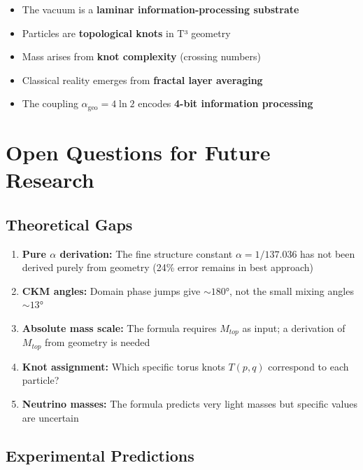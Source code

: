 \documentclass[11pt, a4paper]{article}
\theoremstyle{remark}
\newcommand{\alphageo}{\alpha_{\text{geo}}}
\begin{document}
\begin{itemize}
    \item The vacuum is a \textbf{laminar information-processing substrate}
    \item Particles are \textbf{topological knots} in T³ geometry
    \item Mass arises from \textbf{knot complexity} (crossing numbers)
    \item Classical reality emerges from \textbf{fractal layer averaging}
    \item The coupling $\alphageo = 4\ln 2$ encodes \textbf{4-bit information processing}
\end{itemize}

\section{Open Questions for Future Research}

\subsection{Theoretical Gaps}

\begin{enumerate}
    \item \textbf{Pure $\alpha$ derivation:} The fine structure constant $\alpha = 1/137.036$ has not been derived purely from geometry (24\% error remains in best approach)
    
    \item \textbf{CKM angles:} Domain phase jumps give $\sim 180°$, not the small mixing angles $\sim 13°$
    
    \item \textbf{Absolute mass scale:} The formula requires $M_{top}$ as input; a derivation of $M_{top}$ from geometry is needed
    
    \item \textbf{Knot assignment:} Which specific torus knots $T(p,q)$ correspond to each particle?
    
    \item \textbf{Neutrino masses:} The formula predicts very light masses but specific values are uncertain
\end{enumerate}

\subsection{Experimental Predictions}
\end{document}
